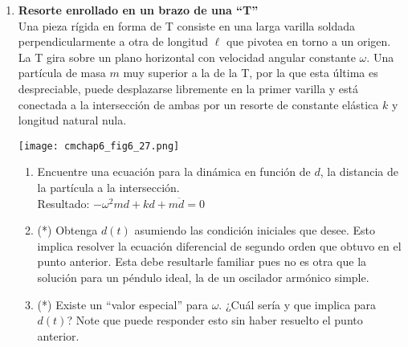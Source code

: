 \documentclass[11pt, a4paper, twoside]{article}
\begin{document}
\begin{enumerate}
\item
	\begin{minipage}[t][3.9cm]{0.7\textwidth}
		\textbf{Resorte enrollado en un brazo de una ``T''}\\
		Una pieza rígida en forma de T consiste en una larga varilla soldada perpendicularmente a otra de longitud \(\ell\) que pivotea en torno a un origen.
		La T gira sobre un plano horizontal con velocidad angular constante \(\omega\).
		Una partícula de masa \(m\) muy superior a la de la T, por la que esta última es despreciable, puede desplazarse libremente en la primer varilla y está conectada a la intersección de ambas por un resorte de constante elástica \(k\) y longitud natural nula.
	\end{minipage}
	\begin{minipage}[c][1cm][t]{0.3\textwidth}
		\texttt{[image: cmchap6\_fig6\_27.png]}
	\end{minipage}
	\begin{enumerate}
		\item  Encuentre una ecuación para la dinámica en función de \(d\), la distancia de la partícula a la intersección.\\
		Resultado: \(- \omega^{2} m d + k d + m \ddot{d} = 0\)
		\item (*) Obtenga \(d(t)\) asumiendo las condición iniciales que desee. Esto implica resolver la ecuación diferencial de segundo orden que obtuvo en el punto anterior.
			Esta debe resultarle familiar pues no es otra que la solución para un péndulo ideal, la de un oscilador armónico simple.  
		\item (*) Existe un ``valor especial'' para \(\omega\). ¿Cuál sería y que implica para \(d(t)\)? Note que puede responder esto sin haber resuelto el punto anterior.
	\end{enumerate}


\end{enumerate}
\end{document}
